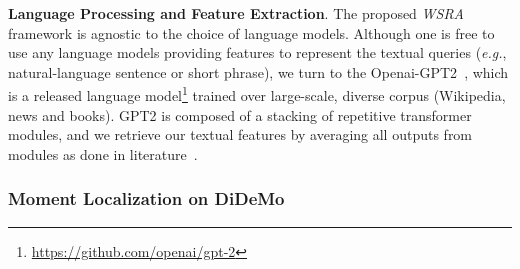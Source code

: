 \noindent \textbf{Language Processing and Feature Extraction}.
The proposed  \textit{WSRA} framework is agnostic to the choice of language models.
Although one is free to use any language models providing features to represent
the textual queries (\emph{e.g.}, natural-language sentence or short phrase),   
we turn to the Openai-GPT2~\citep{radford2019language}, 
which is a released language model\footnote{\url{https://github.com/openai/gpt-2}}
trained over large-scale, diverse corpus (Wikipedia, news and books). 
GPT2 is composed of a stacking of repetitive transformer modules, and we retrieve our textual features by averaging all outputs from modules as done in literature~\citep{xiao2018bertservice}.





\subsubsection{Moment Localization on DiDeMo}

